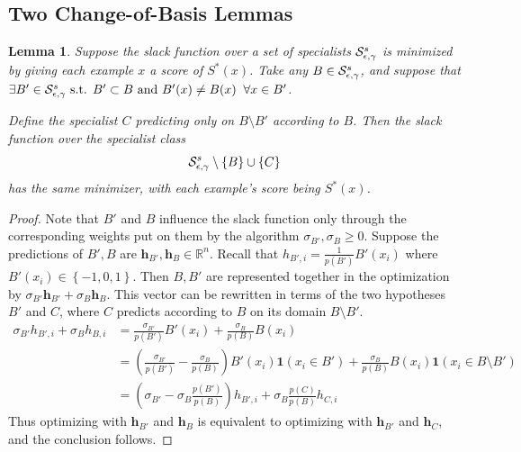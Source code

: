 \documentclass{article}
\newtheorem{lemma}[theorem]{Lemma}
\newcommand{\x}{\vec{x}}
\newcommand{\RR}{\mathbb{R}}      %
\newcommand{\ifn}{\mathbf{1}} %
\newcommand{\lrp}[1]{\left(#1\right)}
\newcommand{\lrsetb}[1]{\left\{#1\right\}}
\newcommand{\vh}{\mathbf{h}}
\begin{document}
\subsection{Two Change-of-Basis Lemmas}

\begin{lemma}
\label{lem:replacespec}
Suppose the slack function over a set of specialists ${\cal S}_{\epsilon,\gamma}^{s}$ is minimized by giving each example $x$ a score of $S^* (x)$. 
Take any $B \in {\cal S}_{\epsilon,\gamma}^{s}$, and suppose that $\exists B' \in {\cal S}_{\epsilon,\gamma}^{s} \mbox{ s.t. } B' \subset B \mbox{ and } B' (x) \neq B (x) \;\;\forall x \in B'$. 

Define the specialist $C$ predicting only on $B \setminus B'$ according to $B$. 
Then the slack function over the specialist class 
$$ \SepsGam^{s} \setminus \lrsetb{B} \cup \lrsetb{C} $$
has the same minimizer, with each example's score being $S^* (x)$. 
\end{lemma}
\begin{proof}
Note that $B'$ and $B$ influence the slack function only through the corresponding weights put on them by the algorithm $\sigma_{B'}, \sigma_{B} \geq 0$. 
Suppose the predictions of $B', B$ are $\vh_{B'}, \vh_{B} \in \RR^{n}$. 
Recall that $h_{B', i} = \frac{1}{p (B')} B' (x_i)$ where $B' (x_i) \in \lrsetb{-1, 0, 1}$. 
Then $B, B'$ are represented together in the optimization by $\sigma_{B'} \vh_{B'} + \sigma_{B} \vh_{B}$. 
This vector can be rewritten in terms of the two hypotheses $B'$ and $C$, where $C$ predicts according to $B$ on its domain $B \setminus B'$. 
\begin{align*}
\sigma_{B'} h_{B', i} + \sigma_{B} h_{B, i} 
&= \frac{\sigma_{B'}}{p (B')} B' (x_i) + \frac{\sigma_{B}}{p (B)} B (x_i) \\ 
&= \lrp{ \frac{\sigma_{B'}}{p (B')} - \frac{\sigma_{B}}{p (B)} } B' (x_i) \ifn(x_i \in B') + \frac{\sigma_{B}}{p (B)} B (x_i) \ifn(x_i \in B \setminus B') \\ 
&= \lrp{ \sigma_{B'} - \sigma_{B} \frac{p (B')}{p (B)} } h_{B', i} + \sigma_{B} \frac{p (C)}{p (B)} h_{C, i} 
\end{align*}
Thus optimizing with $\vh_{B'}$ and $\vh_{B}$ is equivalent to optimizing with $\vh_{B'}$ and $\vh_{C}$, and the conclusion follows.
\end{proof}
\end{document}
